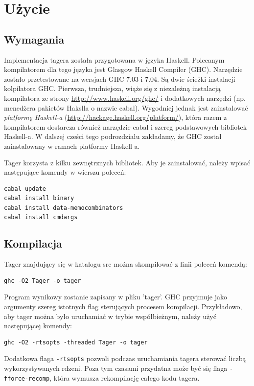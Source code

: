 \documentclass[a4paper,10]{article}
\begin{document}
\section{Użycie}

\subsection{Wymagania}

Implementacja tagera została przygotowana w języka Haskell.
Polecanym kompilatorem dla tego języka jest Glasgow Haskell
Compiler (GHC). Narzędzie zostało przetestowane na wersjach
GHC 7.03 i 7.04. Są dwie ścieżki instalacji kolpilatora GHC.
Pierwsza, trudniejsza, wiąże się z niezależną instalacją
kompilatora ze strony \url{http://www.haskell.org/ghc/}
i dodatkowych narzędzi (np. menedżera pakietów
Hakslla o nazwie cabal). Wygodniej jednak jest zainstalować
\emph{platformę Haskell-a} (\url{http://hackage.haskell.org/platform/}),
która razem z kompilatorem dostarcza również narzędzie cabal
i szereg podstawowych bibliotek Haskell-a.
W dalszej cześci tego podrozdziału zakładamy, że GHC został
zainstalowany w ramach platformy Haskell-a.

Tager korzysta z kilku zewnętrznych bibliotek.
Aby je zainstalować, należy wpisać następujące komendy
w wierszu poleceń: 

\begin{verbatim}
cabal update
cabal install binary
cabal install data-memocombinators
cabal install cmdargs
\end{verbatim}

\subsection{Kompilacja}

Tager znajdujący się w katalogu src można skompilować z linii poleceń
komendą:
\begin{verbatim}
ghc -O2 Tager -o tager
\end{verbatim}
Program wynikowy zostanie zapisany w pliku 'tager'.
GHC przyjmuje jako argumenty szereg istotnych flag sterujących
procesem kompilacji. Przykładowo, aby tager można było uruchamiać
w trybie współbieżnym, należy użyć następującej komendy:
\begin{verbatim}
ghc -O2 -rtsopts -threaded Tager -o tager
\end{verbatim}
Dodatkowa flaga \verb|-rtsopts| pozwoli podczas uruchamiania tagera
sterować liczbą wykorzystywanych rdzeni.
Poza tym czasami przydatna może być się flaga \verb|-fforce-recomp|,
która wymusza rekompilację całego kodu tagera.
\end{document}
